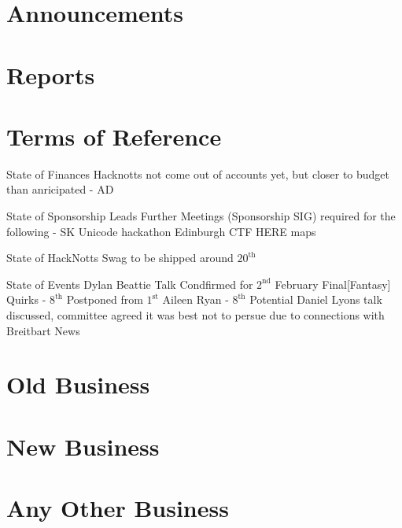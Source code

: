 \documentclass[11pt,hacksoc]{meetingmins}
\begin{document}
\maketitle

\section{Announcements}

\section{Reports}


\section{Terms of Reference}
\begin{items}
\item {State of Finances}
\subitem Hacknotts not come out of accounts yet, but closer to budget than anricipated - AD
\item {State of Sponsorship Leads}
\subitem Further Meetings (Sponsorship SIG) required for the following - SK
\subsubitem Unicode hackathon
\subsubitem Edinburgh CTF
\subsubitem HERE maps
\item {State of HackNotts}
\subitem  Swag to be shipped around $20^{\mathrm{th}}$
\item {State of Events}
\subitem Dylan Beattie Talk Condfirmed for $2^{\mathrm{nd}}$ February
\subitem Final[Fantasy] Quirks - $8^{\mathrm{th}}$ 
\subsubitem Postponed from $1^{\mathrm{st}}$
\subitem Aileen Ryan - $8^{\mathrm{th}}$
\subitem Potential Daniel Lyons talk discussed, committee agreed it was best not to persue due to connections with Breitbart News
\end{items}

\section{Old Business}

\section{New Business}
  

\section{Any Other Business}

\vspace{1em}
\end{document}
